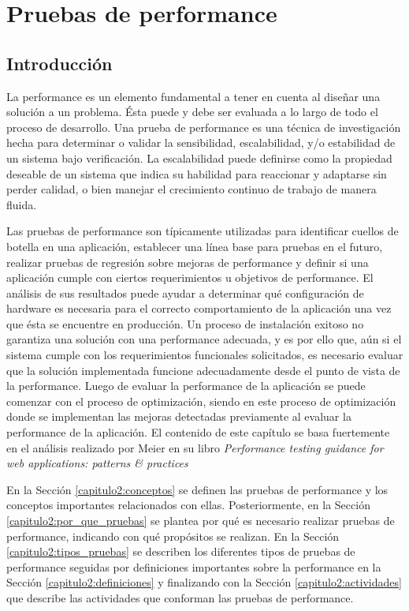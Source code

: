 
\chapter{ Pruebas de performance }
\label{capitulo2}

\section{Introducción}
\label{capitulo2:introduccion}

La performance es un elemento fundamental a tener en cuenta al diseñar una solución a un problema. Ésta puede y debe ser evaluada a lo largo de todo el proceso de desarrollo.
Una prueba de performance es una técnica de investigación hecha para determinar o validar la sensibilidad, escalabilidad, y/o estabilidad de un sistema bajo verificación.
La escalabilidad puede definirse como la propiedad deseable de un sistema que indica su habilidad para reaccionar y adaptarse sin perder calidad, o bien manejar el crecimiento continuo de trabajo de manera fluida.

Las pruebas de performance son típicamente utilizadas para identificar cuellos de botella en una aplicación, establecer una línea base para pruebas en el futuro, realizar pruebas de regresión sobre mejoras de performance y definir si una aplicación cumple con ciertos requerimientos u objetivos de performance. El análisis de sus resultados puede ayudar a determinar qué configuración de hardware es necesaria para el correcto comportamiento de la aplicación una vez que ésta se encuentre en producción.
 Un proceso de instalación exitoso no garantiza una solución con una performance adecuada, y es por ello que, aún si el sistema cumple con los requerimientos funcionales solicitados, es necesario evaluar que la solución implementada funcione adecuadamente desde el punto de vista de la performance.
Luego de evaluar la performance de la aplicación se puede comenzar con el proceso de optimización, siendo en este proceso de optimización donde se implementan las mejoras detectadas previamente al evaluar la performance de la aplicación.
El contenido de este capítulo se basa fuertemente en el análisis realizado por Meier en su libro \emph{Performance testing guidance for web applications: patterns \& practices}\cite{Meier:2007:PTG:1461439}

En la Sección \ref{capitulo2:conceptos} se definen las pruebas de performance y los conceptos importantes relacionados con ellas. Posteriormente, en la Sección
\ref{capitulo2:por_que_pruebas} se plantea por qué es necesario realizar pruebas de performance, indicando con qué propósitos se realizan. En la Sección 
\ref{capitulo2:tipos_pruebas} se describen los diferentes tipos de pruebas de performance seguidas por definiciones importantes sobre la performance en la Sección 
\ref{capitulo2:definiciones} y finalizando con la Sección \ref{capitulo2:actividades} que describe las actividades que conforman las pruebas de performance.

